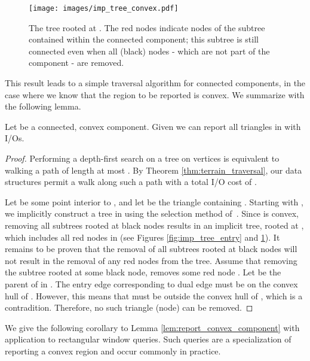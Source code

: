   \begin{figure}[th]
	  \centering 
	  \texttt{[image: images/imp\_tree\_convex.pdf]}
	  \caption[Tree rooted at ]{ The tree rooted at . 
	    The red nodes indicate nodes of the subtree contained within the 
	    connected component; this subtree is still connected even when all 
	    (black) nodes - which are not part of the component - 
	    are removed.} \label{fig:implicit_tree}
  \end{figure}

  This result leads to a simple traversal algorithm for connected 
  components, in the case where we know that the region to be reported 
  is convex.
  We summarize with the following lemma.

  \begin{lemma}\label{lem:report_convex_component}
  Let  be a connected, convex component.
  Given  we can report all triangles in  with 
   I/Os.
  \end{lemma}

  \begin{proof}
  Performing a depth-first search on a tree on  vertices is equivalent 
  to walking a path of length at most .
  By Theorem \ref{thm:terrain_traversal}, our data structures permit a walk along 
  such a path with a total I/O cost of .

  Let  be some point interior to , and let  be
  the triangle containing .
  Starting with , we implicitly construct a tree in  using the 
  selection method of~\cite{DBLP:journals/gis/BergKOO97}.
  Since  is convex, removing all subtrees rooted at black nodes results 
  in an implicit tree, rooted at , which includes all red nodes in 
  (see Figures \ref{fig:imp_tree_entry} and \ref{fig:implicit_tree}).
  It remains to be proven that the removal of all subtrees rooted at black nodes
  will not result in the removal of any red nodes from the tree.
  Assume that removing the subtree rooted at some black node,  removes some
  red node . 
  Let  be the parent of  in . 
  The entry edge corresponding to dual edge  must be on the convex
  hull of .
  However, this means that  must be outside the convex hull of , which
  is a contradition.
  Therefore, no such triangle (node)  can be removed.
  \end{proof}
  
  We give the following corollary to Lemma \ref{lem:report_convex_component}
  with application to rectangular window queries.
  Such queries are a specialization of reporting a convex region 
  and occur commonly in practice.

